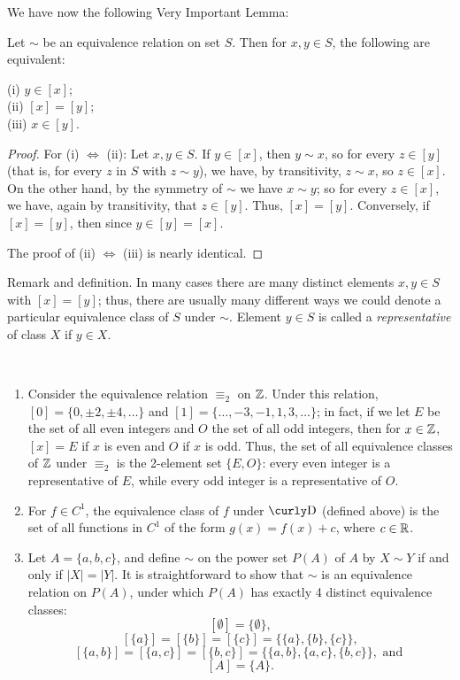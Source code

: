   We have now the following Very Important
Lemma:
\begin{lem}\label{vil.lem} Let $\sim$ be an equivalence relation on set $S$.  Then for $x,y\in S$, the following are equivalent:
\begin{center}
(i) $y\in [x]$;\\ (ii) $[x]=[y]$; \\ (iii) $x\in [y]$.
\end{center}
\end{lem}

\begin{proof} For (i) $\Leftrightarrow$ (ii): Let $x, y\in S$.  If $y\in
[x]$, then $y \sim x$, so for every $z\in [y]$ (that is, for every
$z$ in $S$ with $z\sim y$), we have, by transitivity, $z\sim x$, so
$z\in [x]$. On the other hand, by the symmetry of $\sim$ we have
$x\sim y$; so for every $z\in [x]$, we have, again by transitivity,
that $z\in [y]$. Thus, $[x]=[y]$. Conversely, if $[x]=[y]$, then
since $y\in [y]=[x]$.

\indent The proof of (ii) $\Leftrightarrow$ (iii) is nearly
identical.\end{proof}

\begin{df}{Remark and definition.} In many cases there are
many distinct elements $x,y\in S$ with $[x]=[y]$; thus, there
are usually many different ways we could denote a particular
equivalence class of $S$ under $\sim$. Element $y\in S$ is
called a \textit{representative} of class $X$ if $y\in X$.\end{df}

\begin{example}{}\ \begin{enumerate}\item Consider the equivalence relation $\equiv_2$ on
$\mathbb{Z}$.  Under this relation, $[0]=\{0,\pm 2, \pm 4, \ldots\}$
and $[1]=\{\ldots, -3, -1, 1, 3, \ldots\}$; in fact, if we let
$E$ be the set of all even integers and $O$ the set of all odd
integers, then for $x\in \mathbb{Z}$, $[x]=E$ if $x$ is even and $O$ if
$x$ is odd. Thus, the set of all equivalence classes of $\mathbb{Z}$
under $\equiv_2$ is the 2-element set $\{E,O\}$: every even
integer is a representative of $E$, while every odd integer is
a representative of $O$.

\item For $f\in C^1$, the equivalence class of $f$ under $\D$
    (defined above)
    is
    the set of all functions in $C^1$ of the
    form $g(x)=f(x)+c$, where $c\in \mathbb{R}$.

\item Let $A=\{a,b,c\}$, and define $\sim$ on the power set $P(A)$ of $A$ by $X\sim Y$ if
and only if $|X|=|Y|$. It is straightforward to show that $\sim$ is
an equivalence relation on $P(A)$, under which $P(A)$ has exactly 4
distinct equivalence classes:
$$[\emptyset]=\{\emptyset\},$$
$$[\{a\}]=[\{b\}]=[\{c\}]=\{\{a\},\{b\}, \{c\}\},$$
$$[\{a,b\}]=[\{a,c\}]=[\{b,c\}]=\{\{a,b\},\{a,c\},\{b,c\}\}, \mbox{ and }$$
$$[A]=\{A\}.$$
\end{enumerate} \end{example}


